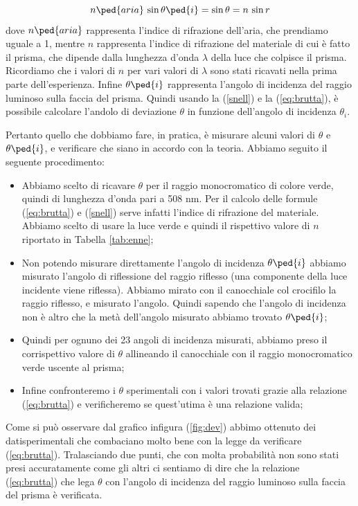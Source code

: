 \begin{equation}
	 n\ped{aria} \, \sin{\theta\ped{i}} = \sin{\theta} = n \, \sin{r}
	 \label{snell}
\end{equation}
%
dove $n\ped{aria}$ rappresenta l'indice di rifrazione dell'aria, che prendiamo uguale a 1, mentre $n$ rappresenta l'indice di rifrazione del materiale di cui è fatto il prisma, che dipende dalla lunghezza d'onda $\lambda$ della luce che colpisce il prisma. Ricordiamo che i valori di $n$ per vari valori di $\lambda$ sono stati ricavati nella prima parte dell'esperienza. Infine $\theta\ped{i}$ rappresenta l'angolo di incidenza del raggio luminoso sulla faccia del prisma.
Quindi usando la (\ref{snell}) e la (\ref{eq:brutta}), è possibile calcolare l'andolo di deviazione $\theta$ in funzione dell'angolo di incidenza $\theta_i$.

Pertanto quello che dobbiamo fare, in pratica, è misurare alcuni valori di $\theta$ e $\theta\ped{i}$, e verificare che siano in accordo con la teoria. Abbiamo seguito il seguente procedimento:

\begin{itemize}
	\item{Abbiamo scelto di ricavare $\theta$ per il raggio monocromatico di colore verde, quindi di lunghezza d'onda pari a 508 nm. Per il calcolo delle formule (\ref{eq:brutta}) e (\ref{snell}) serve infatti l'indice di rifrazione del materiale. Abbiamo scelto di usare la luce verde e quindi il rispettivo valore di $n$ riportato in Tabella \ref{tab:enne};}
	\item{Non potendo misurare direttamente l'angolo di incidenza $\theta\ped{i}$ abbiamo misurato l'angolo di riflessione del raggio riflesso (una componente della luce incidente viene riflessa). Abbiamo mirato con il canocchiale col crocifilo la raggio riflesso, e misurato l'angolo. Quindi sapendo che l'angolo di incidenza non è altro che la metà dell'angolo misurato abbiamo trovato $\theta\ped{i}$;}
	\item{Quindi per ognuno dei 23 angoli di incidenza misurati, abbiamo preso il corrispettivo valore di $\theta$ allineando il canocchiale con il raggio monocromatico verde uscente al prisma;}
	\item{Infine confronteremo i $\theta$ sperimentali con i valori trovati grazie alla relazione (\ref{eq:brutta}) e verificheremo se quest'utima è una relazione valida;}
\end{itemize}

Come si può osservare dal grafico infigura (\ref{fig:dev}) abbimo ottenuto dei datisperimentali che combaciano molto bene con la legge da verificare (\ref{eq:brutta}). Tralasciando due punti, che con molta probabilità non sono stati presi accuratamente come gli altri ci sentiamo di dire che la relazione (\ref{eq:brutta}) che lega $\theta$ con l'angolo di incidenza del raggio luminoso sulla faccia del prisma è verificata.

